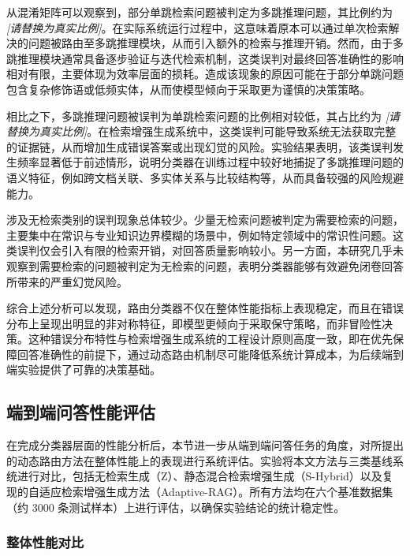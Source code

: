 从混淆矩阵可以观察到，部分单跳检索问题被判定为多跳推理问题，其比例约为 \textit{[请替换为真实比例]}。在实际系统运行过程中，这意味着原本可以通过单次检索解决的问题被路由至多跳推理模块，从而引入额外的检索与推理开销。然而，由于多跳推理模块通常具备逐步验证与迭代检索机制，这类误判对最终回答准确性的影响相对有限，主要体现为效率层面的损耗。造成该现象的原因可能在于部分单跳问题包含复杂修饰语或低频实体，从而使模型倾向于采取更为谨慎的决策策略。

相比之下，多跳推理问题被误判为单跳检索问题的比例相对较低，其占比约为 \textit{[请替换为真实比例]}。在检索增强生成系统中，这类误判可能导致系统无法获取完整的证据链，从而增加生成错误答案或出现幻觉的风险。实验结果表明，该类误判发生频率显著低于前述情形，说明分类器在训练过程中较好地捕捉了多跳推理问题的语义特征，例如跨文档关联、多实体关系与比较结构等，从而具备较强的风险规避能力。

涉及无检索类别的误判现象总体较少。少量无检索问题被判定为需要检索的问题，主要集中在常识与专业知识边界模糊的场景中，例如特定领域中的常识性问题。这类误判仅会引入有限的检索开销，对回答质量影响较小。另一方面，本研究几乎未观察到需要检索的问题被判定为无检索的问题，表明分类器能够有效避免闭卷回答所带来的严重幻觉风险。

综合上述分析可以发现，路由分类器不仅在整体性能指标上表现稳定，而且在错误分布上呈现出明显的非对称特征，即模型更倾向于采取保守策略，而非冒险性决策。这种错误分布特性与检索增强生成系统的工程设计原则高度一致，即在优先保障回答准确性的前提下，通过动态路由机制尽可能降低系统计算成本，为后续端到端实验提供了可靠的决策基础。

\subsection{端到端问答性能评估}\label{sec:e2e_results}

在完成分类器层面的性能分析后，本节进一步从端到端问答任务的角度，对所提出的动态路由方法在整体性能上的表现进行系统评估。实验将本文方法与三类基线系统进行对比，包括无检索生成（Z）、静态混合检索增强生成（S-Hybrid）以及复现的自适应检索增强生成方法（Adaptive-RAG）。所有方法均在六个基准数据集（约 3000 条测试样本）上进行评估，以确保实验结论的统计稳定性。


\subsubsection{整体性能对比}

